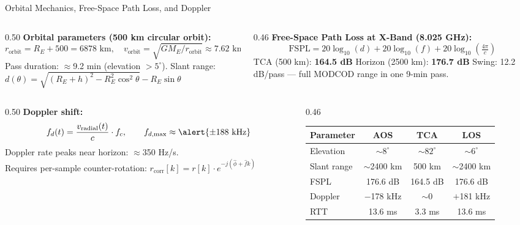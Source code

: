 \documentclass[aspectratio=169,10pt]{beamer}
\begin{document}
\begin{frame}{Orbital Mechanics, Free-Space Path Loss, and Doppler}
  \begin{columns}[T]
    \begin{column}{0.50\textwidth}
      \textbf{Orbital parameters (500 km circular orbit):}
      \[r_\text{orbit} = R_E + 500 = 6878\text{ km},\quad
        v_\text{orbit} = \sqrt{GM_E/r_\text{orbit}} \approx 7.62\text{ km/s}\]
      Pass duration: $\approx$9.2 min (elevation $>5^\circ$). \quad
      Slant range: $d(\theta) = \sqrt{(R_E+h)^2-R_E^2\cos^2\theta} - R_E\sin\theta$
    \end{column}
    \begin{column}{0.46\textwidth}
      \textbf{Free-Space Path Loss at X-Band (8.025 GHz):}
      \[\text{FSPL} = 20\log_{10}(d) + 20\log_{10}(f) + 20\log_{10}\!\left(\tfrac{4\pi}{c}\right)\]
      {\scriptsize TCA (500 km): \textbf{164.5 dB} \quad Horizon (2500 km): \textbf{176.7 dB} \quad
      \alert{Swing: 12.2 dB/pass} — full MODCOD range in one 9-min pass.}
    \end{column}
  \end{columns}

  \vspace{0.5em}
  \begin{columns}[T]
    \begin{column}{0.50\textwidth}
      \textbf{Doppler shift:}
      \[f_d(t) = \frac{v_\text{radial}(t)}{c}\cdot f_c, \qquad
        f_{d,\max} \approx \alert{\pm188\text{ kHz}}\]
      \scriptsize Doppler rate peaks near horizon: $\approx$350 Hz/s.\\
      Requires per-sample counter-rotation: $r_\text{corr}[k] = r[k]\cdot e^{-j(\hat{\phi}+\hat{f}k)}$
    \end{column}
    \begin{column}{0.46\textwidth}
      {\scriptsize
      \begin{tabular}{lccc}
        \toprule
        \textbf{Parameter} & \textbf{AOS} & \textbf{TCA} & \textbf{LOS}\\
        \midrule
        Elevation      & $\sim8^\circ$  & $\sim82^\circ$ & $\sim6^\circ$ \\
        Slant range    & $\sim$2400 km  & 500 km        & $\sim$2400 km \\
        FSPL           & 176.6 dB       & 164.5 dB      & 176.6 dB \\
        Doppler        & $-$178 kHz     & $\sim$0       & $+$181 kHz \\
        RTT            & 13.6 ms        & 3.3 ms        & 13.6 ms \\
        \bottomrule
      \end{tabular}}
    \end{column}
  \end{columns}
\end{frame}
\end{document}
